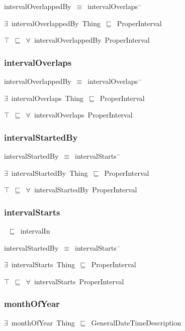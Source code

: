 \documentclass{article}
\begin{document}
intervalOverlappedBy~\ensuremath{\equiv}~intervalOverlaps\ensuremath{^-}

\ensuremath{\exists}~intervalOverlappedBy~Thing~\ensuremath{\sqsubseteq}~ProperInterval

\ensuremath{\top}~\ensuremath{\sqsubseteq}~\ensuremath{\forall}~intervalOverlappedBy~ProperInterval

\subsubsection*{intervalOverlaps}

intervalOverlappedBy~\ensuremath{\equiv}~intervalOverlaps\ensuremath{^-}

\ensuremath{\exists}~intervalOverlaps~Thing~\ensuremath{\sqsubseteq}~ProperInterval

\ensuremath{\top}~\ensuremath{\sqsubseteq}~\ensuremath{\forall}~intervalOverlaps~ProperInterval

\subsubsection*{intervalStartedBy}

intervalStartedBy~\ensuremath{\equiv}~intervalStarts\ensuremath{^-}

\ensuremath{\exists}~intervalStartedBy~Thing~\ensuremath{\sqsubseteq}~ProperInterval

\ensuremath{\top}~\ensuremath{\sqsubseteq}~\ensuremath{\forall}~intervalStartedBy~ProperInterval

\subsubsection*{intervalStarts}

~\ensuremath{\sqsubseteq}~intervalIn

intervalStartedBy~\ensuremath{\equiv}~intervalStarts\ensuremath{^-}

\ensuremath{\exists}~intervalStarts~Thing~\ensuremath{\sqsubseteq}~ProperInterval

\ensuremath{\top}~\ensuremath{\sqsubseteq}~\ensuremath{\forall}~intervalStarts~ProperInterval

\subsubsection*{monthOfYear}

\ensuremath{\exists}~monthOfYear~Thing~\ensuremath{\sqsubseteq}~GeneralDateTimeDescription
\end{document}
